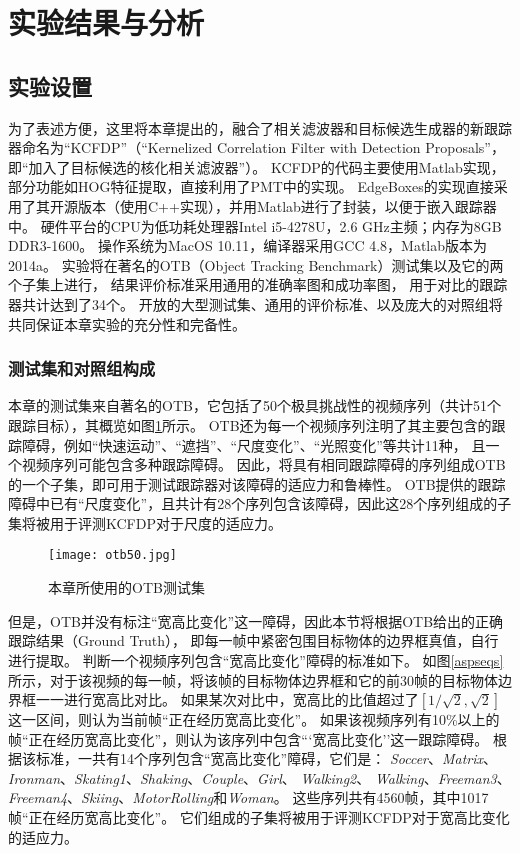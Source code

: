 \section{实验结果与分析}
\subsection{实验设置}
为了表述方便，这里将本章提出的，融合了相关滤波器和目标候选生成器的新跟踪器命名为``KCFDP''（``Kernelized Correlation Filter with Detection Proposals''，即``加入了目标候选的核化相关滤波器''）。
KCFDP的代码主要使用Matlab实现，部分功能如HOG特征提取，直接利用了PMT中的实现。
EdgeBoxes的实现直接采用了其开源版本（使用C++实现），并用Matlab进行了封装，以便于嵌入跟踪器中。
硬件平台的CPU为低功耗处理器Intel i5-4278U，2.6 GHz主频；内存为8GB DDR3-1600。
操作系统为MacOS 10.11，编译器采用GCC 4.8，Matlab版本为2014a。
实验将在著名的OTB（Object Tracking Benchmark）测试集以及它的两个子集上进行，
结果评价标准采用通用的准确率图和成功率图，
用于对比的跟踪器共计达到了34个。
开放的大型测试集、通用的评价标准、以及庞大的对照组将共同保证本章实验的充分性和完备性。

\subsubsection{测试集和对照组构成}
本章的测试集来自著名的OTB，它包括了50个极具挑战性的视频序列（共计51个跟踪目标），其概览如图\ref{otb50}所示。
OTB还为每一个视频序列注明了其主要包含的跟踪障碍，例如``快速运动''、``遮挡''、``尺度变化''、``光照变化''等共计11种，
且一个视频序列可能包含多种跟踪障碍。
因此，将具有相同跟踪障碍的序列组成OTB的一个子集，即可用于测试跟踪器对该障碍的适应力和鲁棒性。
OTB提供的跟踪障碍中已有``尺度变化''，且共计有28个序列包含该障碍，因此这28个序列组成的子集将被用于评测KCFDP对于尺度的适应力。

\begin{figure}[htb]
	\centering
		\texttt{[image: otb50.jpg]}
	\caption{本章所使用的OTB测试集}
	\label{otb50}
\end{figure}

但是，OTB并没有标注``宽高比变化''这一障碍，因此本节将根据OTB给出的正确跟踪结果（Ground Truth），
即每一帧中紧密包围目标物体的边界框真值，自行进行提取。
判断一个视频序列包含``宽高比变化''障碍的标准如下。
如图\ref{aspseqs}所示，对于该视频的每一帧，将该帧的目标物体边界框和它的前30帧的目标物体边界框一一进行宽高比对比。
如果某次对比中，宽高比的比值超过了$[1/\sqrt{2}, \sqrt{2} ]$这一区间，则认为当前帧``正在经历宽高比变化''。
如果该视频序列有10\%以上的帧``正在经历宽高比变化''，则认为该序列中包含```宽高比变化''这一跟踪障碍。
根据该标准，一共有14个序列包含``宽高比变化''障碍，它们是：
\textit{Soccer}、\textit{Matrix}、\textit{Ironman}、\textit{Skating1}、\textit{Shaking}、\textit{Couple}、\textit{Girl}、
\textit{Walking2}、 \textit{Walking}、\textit{Freeman3}、\textit{Freeman4}、\textit{Skiing}、\textit{MotorRolling}和\textit{Woman}。
这些序列共有4560帧，其中1017帧``正在经历宽高比变化''。
它们组成的子集将被用于评测KCFDP对于宽高比变化的适应力。

